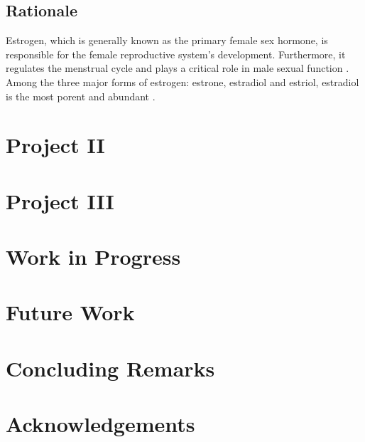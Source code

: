 \documentclass[]{scrbook}
\begin{document}
\section{Rationale}
Estrogen, which is generally known as the primary female sex hormone, is responsible for the female reproductive system's development.
Furthermore, it regulates the menstrual cycle and plays a critical role in male sexual function \cite{Bates2013b,Hess1997b}. 
Among the three major forms of estrogen: estrone, estradiol and estriol, estradiol is the most porent and abundant \cite{Thomas2013c}.

\chapter{Project II}

\chapter{Project III}

\chapter{Work in Progress}

\chapter{Future Work}

\chapter{Concluding Remarks}


\backmatter

\chapter{Acknowledgements}
\printbibliography
\end{document}
